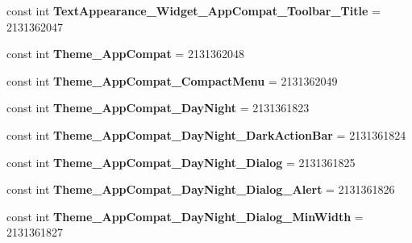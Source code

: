 \begin{DoxyCompactItemize}
const int {\bfseries Text\+Appearance\+\_\+\+Widget\+\_\+\+App\+Compat\+\_\+\+Toolbar\+\_\+\+Title} = 2131362047
\item 
\mbox{\label{class_pinned_app_1_1_droid_1_1_resource_1_1_style_a8bdae98ec6dd871ff127096a9b31e13b}} 
const int {\bfseries Theme\+\_\+\+App\+Compat} = 2131362048
\item 
\mbox{\label{class_pinned_app_1_1_droid_1_1_resource_1_1_style_a063938dbc07913dc3aa280d584d8541e}} 
const int {\bfseries Theme\+\_\+\+App\+Compat\+\_\+\+Compact\+Menu} = 2131362049
\item 
\mbox{\label{class_pinned_app_1_1_droid_1_1_resource_1_1_style_a03111f31178c7ea67f9b43c1f5526140}} 
const int {\bfseries Theme\+\_\+\+App\+Compat\+\_\+\+Day\+Night} = 2131361823
\item 
\mbox{\label{class_pinned_app_1_1_droid_1_1_resource_1_1_style_a359dd77ae0d5ec93b37e1d0a2f7135f5}} 
const int {\bfseries Theme\+\_\+\+App\+Compat\+\_\+\+Day\+Night\+\_\+\+Dark\+Action\+Bar} = 2131361824
\item 
\mbox{\label{class_pinned_app_1_1_droid_1_1_resource_1_1_style_aae85e40820fcc4535b43a65f0b9368f5}} 
const int {\bfseries Theme\+\_\+\+App\+Compat\+\_\+\+Day\+Night\+\_\+\+Dialog} = 2131361825
\item 
\mbox{\label{class_pinned_app_1_1_droid_1_1_resource_1_1_style_a549a7af3440bad3bd1b595b17b8d5f51}} 
const int {\bfseries Theme\+\_\+\+App\+Compat\+\_\+\+Day\+Night\+\_\+\+Dialog\+\_\+\+Alert} = 2131361826
\item 
\mbox{\label{class_pinned_app_1_1_droid_1_1_resource_1_1_style_ae28857479dac437427ecff45ca7e5d1a}} 
const int {\bfseries Theme\+\_\+\+App\+Compat\+\_\+\+Day\+Night\+\_\+\+Dialog\+\_\+\+Min\+Width} = 2131361827
\item 
\mbox{\label{class_pinned_app_1_1_droid_1_1_resource_1_1_style_a53189fc7c000d6ee9d8d6c8a42551d0d}} 

\end{DoxyCompactItemize}
